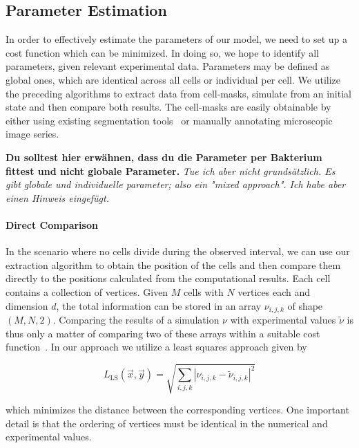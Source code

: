 \documentclass{article}
\begin{document}
\subsection{Parameter Estimation}
\label{section:parameter-estimation}
In order to effectively estimate the parameters of our model, we need to set up a cost function
which can be minimized.
In doing so, we hope to identify all parameters, given relevant experimental data.
Parameters may be defined as global ones, which are identical across all cells or individual per
cell.
We utilize the preceding algorithms to extract data from cell-masks, simulate from an initial state
and then compare both results.
The cell-masks are easily obtainable by either using existing segmentation
tools~\cite{Cutler2022,Stringer2020,Hardo2022} or manually annotating microscopic image series.

\textbf{Du solltest hier erwähnen, dass du die Parameter per Bakterium fittest und nicht globale Parameter.}
\textit{Tue ich aber nicht grundsätzlich. Es gibt globale und individuelle parameter; also ein "mixed approach". Ich habe aber einen Hinweis eingefügt.}

\paragraph{Direct Comparison}
\label{paragraph:direct-comparison}
In the scenario where no cells divide during the observed interval, we can use our extraction
algorithm to obtain the position of the cells and then compare them directly to the positions
calculated from the computational results.
Each cell contains a collection of vertices.
Given $M$ cells with $N$ vertices each and dimension $d$, the total information can be stored in an
array $\nu_{i,j,k}$ of shape $(M,N,2)$.
Comparing the results of a simulation $\nu$ with experimental values $\tilde{\nu}$ is thus only a
matter of comparing two of these arrays within a suitable cost function~\cite{Wang2020}.
In our approach we utilize a least squares approach given by

\begin{equation}
    L_{\text{LS}}(\vec{x}, \vec{y})
        = \sqrt{\sum\limits_{i,j,k}|\nu_{i,j,k} - \tilde{\nu}_{i,j,k}|^2}
\end{equation}

which minimizes the distance between the corresponding vertices.
One important detail is that the ordering of vertices must be identical in the numerical and
experimental values.
\end{document}
